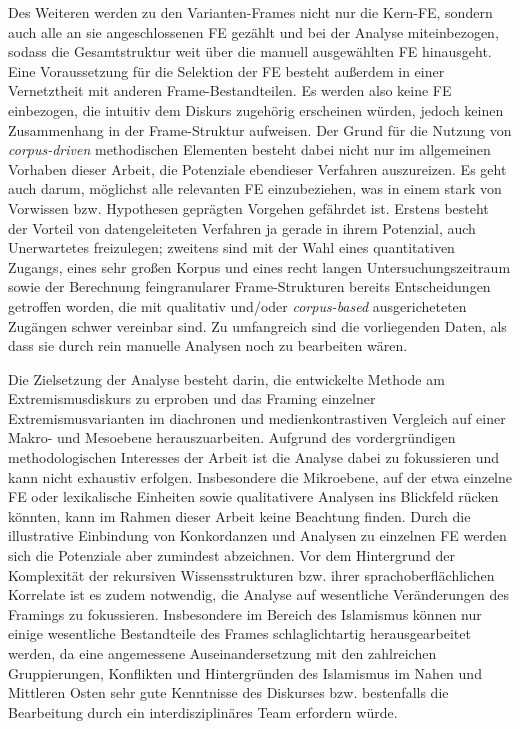 Des Weiteren werden zu den Varianten-Frames nicht nur die Kern-FE, sondern auch alle an sie angeschlossenen FE gezählt und bei der Analyse miteinbezogen, sodass die Gesamtstruktur weit über die manuell ausgewählten FE hinausgeht. Eine Voraussetzung für die Selektion der FE besteht außerdem in einer Vernetztheit mit anderen Frame-Bestandteilen. Es werden also keine FE einbezogen, die intuitiv dem Diskurs zugehörig erscheinen würden, jedoch keinen Zusammenhang in der Frame-Struktur aufweisen. Der Grund für die Nutzung von \emph{corpus-driven} methodischen Elementen besteht dabei nicht nur im allgemeinen Vorhaben dieser Arbeit, die Potenziale ebendieser Verfahren auszureizen. Es geht auch darum, möglichst alle relevanten FE einzubeziehen, was in einem stark von Vorwissen bzw. Hypothesen geprägten Vorgehen gefährdet ist. Erstens besteht der Vorteil von datengeleiteten Verfahren ja gerade in ihrem Potenzial, auch Unerwartetes freizulegen; zweitens sind mit der Wahl eines quantitativen Zugangs, eines sehr großen Korpus und eines recht langen Untersuchungszeitraum sowie der Berechnung feingranularer Frame-Strukturen bereits Entscheidungen getroffen worden, die mit qualitativ und/oder \emph{corpus-based} ausgericheteten Zugängen schwer vereinbar sind. Zu umfangreich sind die vorliegenden Daten, als dass sie durch rein manuelle Analysen noch zu bearbeiten wären.

Die Zielsetzung der Analyse besteht darin, die entwickelte Methode am Extremismusdiskurs zu erproben und das Framing einzelner Extremismusvarianten im diachronen und medienkontrastiven Vergleich auf einer Makro- und Mesoebene herauszuarbeiten. Aufgrund des vordergründigen methodologischen Interesses der Arbeit ist die Analyse dabei zu fokussieren und kann nicht exhaustiv erfolgen. Insbesondere die Mikroebene, auf der etwa einzelne FE oder lexikalische Einheiten sowie qualitativere Analysen ins Blickfeld rücken könnten, kann im Rahmen dieser Arbeit keine Beachtung finden. Durch die illustrative Einbindung von Konkordanzen und Analysen zu einzelnen FE werden sich die Potenziale aber zumindest abzeichnen. Vor dem Hintergrund der Komplexität der rekursiven Wissensstrukturen bzw. ihrer sprachoberflächlichen Korrelate ist es zudem notwendig, die Analyse auf wesentliche Veränderungen des Framings zu fokussieren. Insbesondere im Bereich des Islamismus können nur einige wesentliche Bestandteile des Frames schlaglichtartig herausgearbeitet werden, da eine angemessene Auseinandersetzung mit den zahlreichen Gruppierungen, Konflikten und Hintergründen des Islamismus im Nahen und Mittleren Osten sehr gute Kenntnisse des Diskurses bzw. bestenfalls die Bearbeitung durch ein interdisziplinäres Team erfordern würde.


